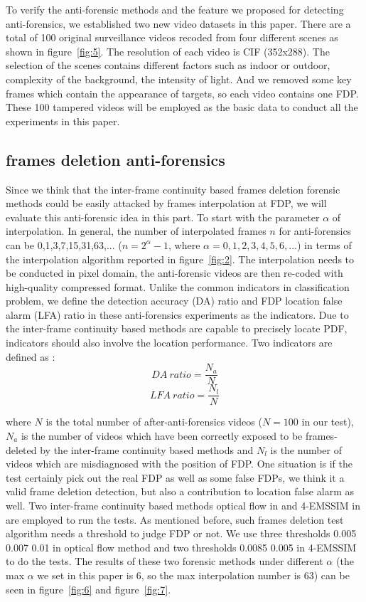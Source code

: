 \documentclass[pdftex,twocolumn,epjc3]{svjour3}          %
\begin{document}
\label{sec:10}
To verify the anti-forensic methods and the feature we proposed for detecting anti-forensics, we established two new video datasets in this paper. There are a total of 100 original surveillance videos recoded from four different scenes as shown in figure~\ref{fig:5}. The resolution of each video is CIF (352x288). The selection of the scenes contains different factors such as indoor or outdoor, complexity of the background, the intensity of light. And we removed some key frames which contain the appearance of targets, so each video contains one FDP. These 100 tampered videos will be employed as the basic data to conduct all the experiments in this paper.

\subsection{frames deletion anti-forensics}
\label{sec:11}
Since we think that the inter-frame continuity based frames deletion forensic methods could be easily attacked by frames interpolation at FDP, we will evaluate this anti-forensic idea in this part. To start with the parameter $\alpha$ of interpolation. In general, the number of interpolated frames $n$ for anti-forensics can be 0,1,3,7,15,31,63,... ($n=2^\alpha-1$, where $\alpha=0,1,2,3,4,5,6,...$) in terms of the interpolation algorithm reported in figure~\ref{fig:2}. The interpolation needs to be conducted in pixel domain, the anti-forensic videos are then re-coded with high-quality compressed format. Unlike the common indicators in classification problem, we define the detection accuracy (DA) ratio and FDP location false alarm (LFA) ratio in these anti-forensics experiments as the indicators. Due to the inter-frame continuity based methods are capable to precisely locate PDF, indicators should also involve the location performance. Two indicators are defined as :
\begin{equation}
DA\ ratio=\frac{N_a}{N}
\end{equation}
\begin{equation}
LFA\ ratio=\frac{N_l}{N}
\end{equation}

where $N$ is the total number of after-anti-forensics videos ($N=100$ in our test), $N_a$ is the number of videos which have been correctly exposed to be frames-deleted by the inter-frame continuity based methods and $N_l$ is the number of videos which are misdiagnosed with the position of FDP. One situation is if the test certainly pick out the real FDP as well as some false FDPs, we think it a valid frame deletion detection, but also a contribution to location false alarm as well. Two inter-frame continuity based methods optical flow in \cite{A10} and 4-EMSSIM in \cite{A12} are employed to run the tests. As mentioned before, such frames deletion test algorithm needs a threshold to judge FDP or not. We use three thresholds {0.005 0.007 0.01} in optical flow method and two thresholds {0.0085 0.005} in 4-EMSSIM to do the tests. The results of these two forensic methods under different $\alpha$ (the max $\alpha$ we set in this paper is 6, so the max interpolation number is 63) can be seen in figure~\ref{fig:6} and figure~\ref{fig:7}.
\end{document}

